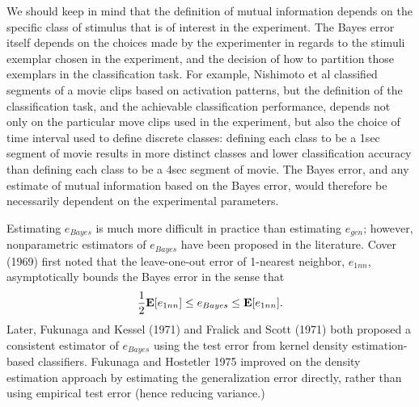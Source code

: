 \documentclass[12pt]{article}
\begin{document}
We should keep in mind that the definition
of mutual information depends on the specific class of stimulus that
is of interest in the experiment.  The Bayes error itself depends on
the choices made by the experimenter in regards to the stimuli
exemplar chosen in the experiment, and the decision of how to
partition those exemplars in the classification task.  For example,
Nishimoto et al classified segments of a movie clips based on
activation patterns, but the definition of the classification task,
and the achievable classification performance, depends not only on the
particular move clips used in the experiment, but also the choice of
time interval used to define discrete classes: defining each class to
be a 1sec segment of movie results in more distinct classes and lower
classification accuracy than defining each class to be a 4sec segment
of movie. The Bayes error, and any estimate of mutual information
based on the Bayes error, would therefore be necessarily dependent on
the experimental parameters.


Estimating $e_{Bayes}$ is much more difficult in practice than
estimating $e_{gen}$; however, nonparametric estimators of $e_{Bayes}$
have been proposed in the literature.  Cover (1969) first noted that
the leave-one-out error of 1-nearest neighbor, $e_{1nn}$,
asymptotically bounds the Bayes error in the sense that
\[
\frac{1}{2}\textbf{E}[e_{1nn}] \leq e_{Bayes} \leq \textbf{E}[e_{1nn}].
\]
Later, Fukunaga and Kessel (1971) and Fralick and Scott (1971) both
proposed a consistent estimator of $e_{Bayes}$ using the test error
from kernel density estimation-based classifiers.  Fukunaga and
Hostetler 1975 improved on the density estimation approach by
estimating the generalization error directly, rather than using
empirical test error (hence reducing variance.)
\end{document}
